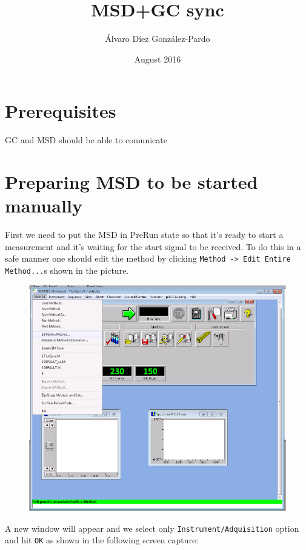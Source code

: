 \documentclass[31pt]{article}
\title{MSD+GC sync}
\author{Álvaro Díez González-Pardo }
\date{August 2016}
\begin{document}
\maketitle

\section{Prerequisites}

GC and MSD should be able to comunicate 

\newpage

\section{Preparing MSD to be started manually}
First we need to put the MSD in PreRun state so that it's ready to start a measurement and it's waiting for the start signal to be received. To do this in a safe manner one should edit the method by clicking \texttt{Method -> Edit Entire Method...}s shown in the picture.

\begin{figure}[h!]
\centering
\includegraphics[width=1.3\textwidth]{1-EditMethod.png}
\label{fig:univerise}
\end{figure}

\newpage

A new window will appear and we select only \texttt{Instrument/Adquisition} option and hit \texttt{OK} as shown in the following screen capture:
\end{document}
